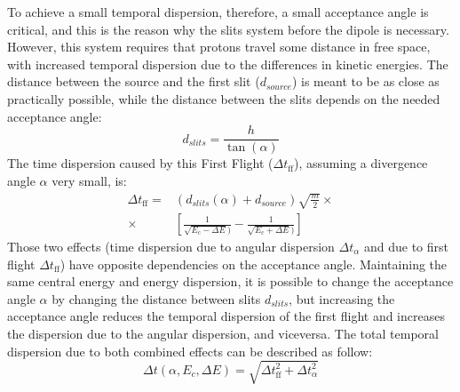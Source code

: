 \documentclass{cup-hpl}
\begin{document}
To achieve a small temporal dispersion, therefore, a small acceptance angle is critical, and this is the reason why the slits system before the dipole is necessary. However, this system requires that protons travel some distance in free space, with increased temporal dispersion due to the differences in kinetic energies. The distance between the source and the first slit ($d_{source}$) is meant to be as close as practically possible, while the distance between the slits depends on the needed acceptance angle:
\begin{equation}
d_{slits} = \frac{h}{\tan(\alpha)}
\label{Eq: slit distance}
\end{equation}
The time dispersion caused by this First Flight ($\Delta t_{\text{ff}}$), assuming a divergence angle $\alpha$ very small, is:
\begin{equation}
\begin{aligned}
\Delta t_{\text{ff}} = & (d_{slits}(\alpha) + d_{source}) \sqrt{\frac{m}{2}} \times \\
\times &\left[ \frac{1}{\sqrt{E_c - \Delta E})} - \frac{1}{\sqrt{E_c + \Delta E})}\right]
\label{Eq: FF time dispersion}
\end{aligned}
\end{equation}
Those two effects (time dispersion due to angular dispersion $\Delta t_{\alpha}$ and due to first flight $\Delta t_{\text{ff}}$) have opposite dependencies on the acceptance angle. Maintaining the same central energy and energy dispersion, it is possible to change the acceptance angle $\alpha$ by changing the distance between slits $d_{slits}$, but increasing the acceptance angle reduces the temporal dispersion of the first flight and increases the dispersion due to the angular dispersion, and viceversa. The total temporal dispersion due to both combined effects can be described as follow:
\begin{equation}
\Delta t(\alpha, E_c, \Delta E) = \sqrt{\Delta t_{\text{ff}}^2 + \Delta t_{\alpha}^2}
\label{Eq: Total time dispersion}
\end{equation}
\end{document}
